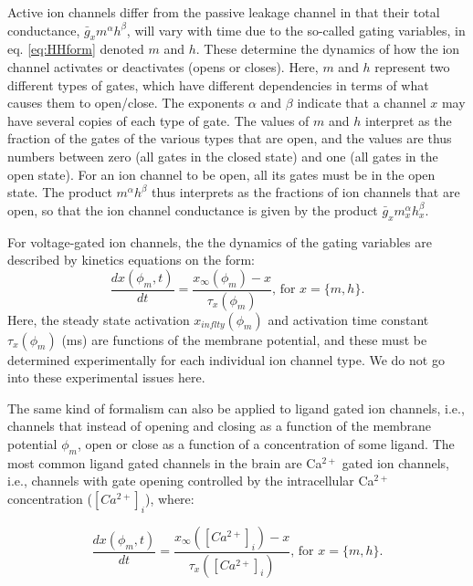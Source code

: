 Active ion channels differ from the passive leakage channel in that their total conductance, $\bar{g}_{x} m^{\alpha} h^{\beta}$, will vary with time due to the so-called gating variables, in eq. \ref{eq:HHform} denoted $m$ and $h$. These determine the dynamics of how the ion channel activates or deactivates (opens or closes). Here, $m$ and $h$ represent two different types of gates, which have different dependencies in terms of what causes them to open/close. The exponents $\alpha$ and $\beta$ indicate that a channel $x$ may have several copies of each type of gate. The values of $m$ and $h$ interpret as the fraction of the gates of the various types that are open, and the values are thus numbers between zero (all gates in the closed state) and one (all gates in the open state). For an ion channel to be open, all its gates must be in the open state. The product $m^{\alpha} h^{\beta}$ thus interprets as the fractions of ion channels that are open, so that the ion channel conductance is given by the product $\bar{g}_x m_x^{\alpha} h_x^{\beta}$.

For voltage-gated ion channels, the the dynamics of the gating variables are described by kinetics equations on the form:
\begin{equation}
\frac{dx(\phi_m,t)}{dt} = \frac{x_{\infty}(\phi_m) - x}{\tau_x(\phi_m)},  \, \text{for } x = \{m,h\}.
\label{eq:HHgate}
\end{equation}
Here, the steady state activation $x_{inflty}(\phi_m)$ and activation time constant $\tau_x(\phi_m)$ (ms) are functions of the membrane potential, and these must be determined experimentally for each individual ion channel type. We do not go into these experimental issues here. 

The same kind of formalism can also be applied to ligand gated ion channels, i.e., channels that instead of opening and closing as a function of the membrane potential $\phi_m$, open or close as a function of a concentration of some ligand. The most common ligand gated channels in the brain are Ca$^{2+}$ gated ion channels, i.e., channels with gate opening controlled by the intracellular Ca$^{2+}$ concentration ($[Ca^{2+}]_i$), where:

\begin{equation}
\frac{dx(\phi_m,t)}{dt} = \frac{x_{\infty}([Ca^{2+}]_i) - x}{\tau_x([Ca^{2+}]_i)},  \, \text{for } x = \{m,h\}.
\label{eq:HHgateCa}
\end{equation}


